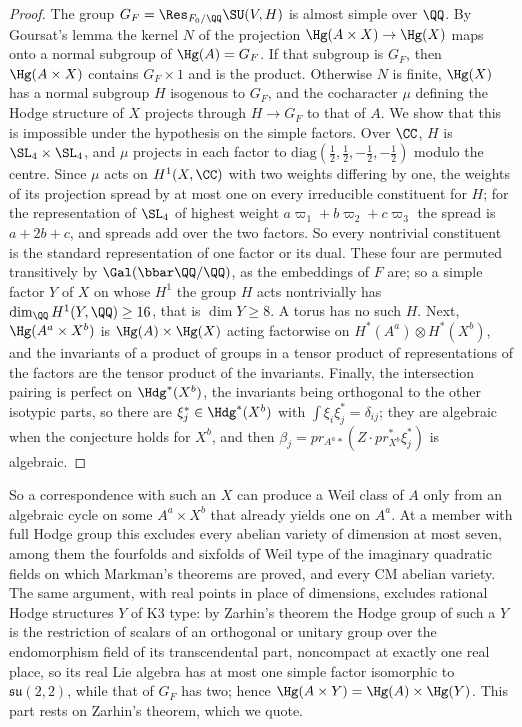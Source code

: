 \begin{proof}
The group $G_{F}=\Res_{F_{0}/\QQ}\SU(V,H)$ is almost simple over $\QQ$. By
Goursat's lemma the kernel $N$ of the projection $\Hg(A\times X)\to\Hg(X)$
maps onto a normal subgroup of $\Hg(A)=G_{F}$. If that subgroup is $G_{F}$,
then $\Hg(A\times X)$ contains $G_{F}\times1$ and is the product. Otherwise
$N$ is finite, $\Hg(X)$ has a normal subgroup $H$ isogenous to $G_{F}$, and
the cocharacter $\mu$ defining the Hodge structure of $X$ projects through
$H\to G_{F}$ to that of $A$. We show that this is impossible under the
hypothesis on the simple factors. Over $\CC$, $H$ is $\SL_{4}\times\SL_{4}$,
and $\mu$ projects in each factor to
$\mathrm{diag}(\frac12,\frac12,-\frac12,-\frac12)$ modulo the centre. Since
$\mu$ acts on $H^{1}(X,\CC)$ with two weights differing by one, the weights of
its projection spread by at most one on every irreducible constituent for
$H$; for the representation of $\SL_{4}$ of highest weight
$a\varpi_{1}+b\varpi_{2}+c\varpi_{3}$ the spread is $a+2b+c$, and spreads add
over the two factors. So every nontrivial constituent is the standard
representation of one factor or its dual. These four are permuted
transitively by $\Gal(\bbar\QQ/\QQ)$, as the embeddings of $F$ are; so a simple
factor $Y$ of $X$ on whose $H^{1}$ the group $H$ acts nontrivially has
$\dim_{\QQ}H^{1}(Y,\QQ)\ge16$, that is $\dim Y\ge8$. A torus has no such $H$.
Next, $\Hg(A^{a}\times X^{b})$ is $\Hg(A)\times\Hg(X)$ acting factorwise on
$H^{*}(A^{a})\otimes H^{*}(X^{b})$, and the invariants of a product of groups
in a tensor product of representations of the factors are the tensor product
of the invariants. Finally, the intersection pairing is perfect on
$\Hdg^{*}(X^{b})$, the invariants being orthogonal to the other isotypic
parts, so there are $\xi_{j}^{*}\in\Hdg^{*}(X^{b})$ with
$\int\xi_{i}\xi_{j}^{*}=\delta_{ij}$; they are algebraic when the conjecture
holds for $X^{b}$, and then $\beta_{j}=pr_{A^{a}*}(Z\cdot pr_{X^{b}}^{*}\xi_{j}^{*})$
is algebraic.
\end{proof}

So a correspondence with such an $X$ can produce a Weil class of $A$ only from
an algebraic cycle on some $A^{a}\times X^{b}$ that already yields one on
$A^{a}$. At a member with full Hodge group this excludes every abelian
variety of dimension at most seven, among them the fourfolds and sixfolds of
Weil type of the imaginary quadratic fields on which Markman's theorems are
proved, and every CM abelian variety. The same argument, with real points in
place of dimensions, excludes rational Hodge structures $Y$ of K3 type: by
Zarhin's theorem \cite{Zar83} the Hodge group of such a $Y$ is the restriction
of scalars of an orthogonal or unitary group over the endomorphism field of
its transcendental part, noncompact at exactly one real place, so its real Lie
algebra has at most one simple factor isomorphic to $\mathfrak{su}(2,2)$,
while that of $G_{F}$ has two; hence $\Hg(A\times Y)=\Hg(A)\times\Hg(Y)$.
This part rests on Zarhin's theorem, which we quote.

